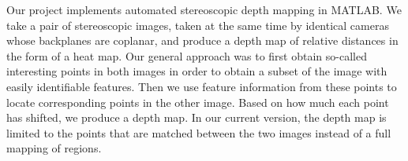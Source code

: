 Our project implements automated stereoscopic depth mapping in MATLAB.  We take a pair of stereoscopic images, taken at the same time by identical cameras whose backplanes are coplanar, and produce a depth map of relative distances in the form of a heat map.  Our general approach was to first obtain so-called interesting points in both images in order to obtain a subset of the image with easily identifiable features.  Then we use feature information from these points to locate corresponding points in the other image. Based on how much each point has shifted, we produce a depth map. In our current version, the depth map is limited to the points that are matched between the two images instead of a full mapping of regions.
